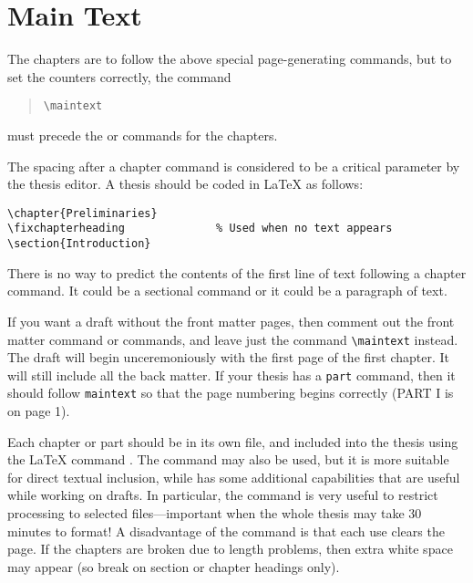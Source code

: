 \section{Main Text}

The chapters are to follow the above special page-generating commands,
but to set the counters correctly, the command
\begin{quote}
    \verb|\maintext|
\end{quote}
must precede the \verb|| or \verb|| commands for
the chapters.

The spacing after a chapter command is considered to be a critical
parameter by the thesis editor. A thesis should be coded in \LaTeX{} as
follows:

\begin{verbatim}
\chapter{Preliminaries}
\fixchapterheading              % Used when no text appears
\section{Introduction}
\end{verbatim}

There is no way to predict the contents of the first line of text
following a chapter command. It could be a sectional command or it could
be a paragraph of text.

If you want a draft  without the front matter pages, then comment out
the front matter command or commands, and leave just the command
\verb|\maintext| instead.  The draft
will begin unceremoniously with the first page of the first chapter.  It will
still include all the back matter. If your thesis has a {\tt part}
command, then it should follow {\tt maintext} so that the page numbering
begins correctly (PART I is on page 1).

Each chapter or part should be in its own file, and included into the thesis
using the \LaTeX{} command \verb||.  The command \verb||
may also be used, but it is more suitable for direct textual inclusion,
while \verb|| has some additional capabilities that are useful
while working on drafts.
In particular, the \verb|| command is very useful to restrict
processing to selected \verb|| files---important when the whole
thesis may take 30 minutes to format!
A disadvantage of the \verb|| command is that each use
clears the page. If the chapters are broken due to length problems, then
extra white space may appear (so break on section or chapter
headings only).

